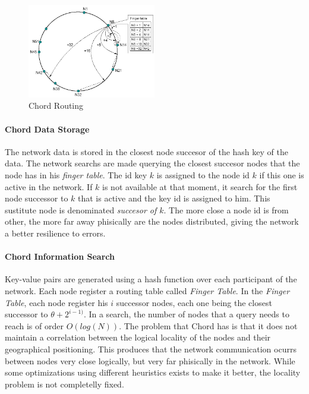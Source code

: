\label{sec:chord}
\begin{figure}
\center
\includegraphics[width=0.5\textwidth]{img/chord-search}
\caption{Chord Routing}
\label{fig:p2p_estructured_chord_search}
\end{figure}

\paragraph{Chord Data Storage}
The network data is stored in the closest node succesor of the hash key of the
data. The network searchs are made querying the closest succesor
nodes that the node has in his \textit{finger table}.
The id key $k$ is assigned to the node id $k$ if this one is active in the
network. If $k$ is not available at that moment, it search for the first node
successor to $k$ that is active and the key id is assigned to him. This
sustitute node is denominated \textit{succesor of $k$}.
The more close a node id is from other, the more far away phisically are the
nodes distributed, giving the network a better resilience to errors.

\paragraph{Chord Information Search}
Key-value pairs are generated using a hash function over each participant of
the network.  Each node register a routing table called \textit{Finger Table}.
In the \textit{Finger Table}, each node register his $i$ successor nodes, each
one being the closest successor to $\theta + 2^{i-1)}$. 
In a search, the number of nodes that a query needs to reach is of order
$O(log(N))$.
The problem that Chord has is that it does not maintain a correlation
between the logical locality of the nodes and their geographical positioning. This
produces that the network communication ocurrs between nodes very close
logically, but very far phisically in the network. While some
optimizations using different heuristics exists to make it better, the locality
problem is not completelly fixed.

